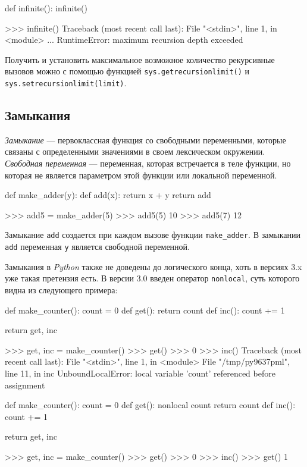 \begin{pylst}{}{}
def infinite():
    infinite()

>>> infinite()
Traceback (most recent call last):
  File "<stdin>", line 1, in <module>
...
RuntimeError: maximum recursion depth exceeded
\end{pylst}

Получить и установить максимальное возможное количество рекурсивные вызовов можно с помощью функцией \lstinline{sys.getrecursionlimit()} и \lstinline{sys.setrecursionlimit(limit)}.

\subsection{Замыкания}
\emph{Замыкание} — первоклассная функция со свободными переменными, которые связаны с определенными значениями в своем лексическом окружении. \emph{Свободная переменная} — переменная, которая встречается в теле функции, но которая не является параметром этой функции или локальной переменной.
\begin{pylst}{}{}
def make_adder(y):
    def add(x):
        return x + y
    return add

>>> add5 = make_adder(5)
>>> add5(5)
10
>>> add5(7)
12
\end{pylst}

Замыкание \lstinline{add} создается при каждом вызове функции \lstinline{make_adder}. В замыкании \lstinline{add} переменная \lstinline{y} является свободной переменной.

Замыкания в \emph{Python} также не доведены до логического конца, хоть в версиях 3.x уже такая претензия есть. В версии 3.0 введен оператор \lstinline{nonlocal}, суть которого видна из следующего примера:
\begin{pylst}{}{}
def make_counter():
    count = 0
    def get():
        return count
    def inc():
        count += 1

    return get, inc

>>> get, inc = make_counter()
>>> get()
>>> 0
>>> inc()
Traceback (most recent call last):
  File "<stdin>", line 1, in <module>
  File "/tmp/py9637pml", line 11, in inc
UnboundLocalError: local variable 'count' referenced before assignment

def make_counter():
    count = 0
    def get():
        nonlocal count
        return count
    def inc():
        count += 1

    return get, inc

>>> get, inc = make_counter()
>>> get()
>>> 0
>>> inc()
>>> get()
1
\end{pylst}

